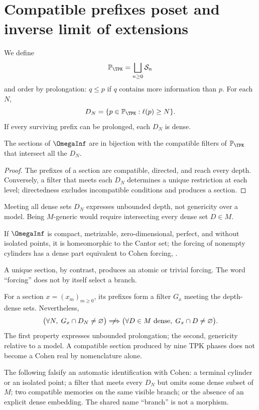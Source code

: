 \section{Compatible prefixes poset and inverse limit of extensions}

We define
\[
  \mathbb P_{\TPK}=\bigsqcup_{n\ge0}\mathcal S_n
\]
and order by prolongation: \(q\le p\) if \(q\) contains more information
than \(p\). For each \(N\),
\[
  D_N=\{p\in\mathbb P_{\TPK}:\ell(p)\ge N\}.
\]
If every surviving prefix can be prolonged, each \(D_N\) is dense.

\begin{theorem}
The sections of \(\OmegaInf\) are in bijection with the compatible filters
of \(\mathbb P_{\TPK}\) that intersect all the \(D_N\).
\end{theorem}

\begin{proof}
The prefixes of a section are compatible, directed, and reach every
depth. Conversely, a filter that meets each \(D_N\) determines a
unique restriction at each level; directedness excludes incompatible
conditions and produces a section.
\end{proof}

Meeting all dense sets \(D_N\) expresses unbounded depth, not
genericity over a model. Being \(M\)-generic would require intersecting every
dense set \(D\in M\).

\begin{proposition}
If \(\OmegaInf\) is compact, metrizable, zero-dimensional, perfect, and without
isolated points, it is homeomorphic to the Cantor set; the forcing of nonempty cylinders
has a dense part equivalent to Cohen forcing,
\citep{cohen1963,cohen1964}.
\end{proposition}

A unique section, by contrast, produces an atomic or trivial forcing.
The word “forcing” does not by itself select a branch.

For a section \(x=(x_m)_{m\ge0}\), its prefixes form a filter \(G_x\)
meeting the depth-dense sets. Nevertheless,
\[
  \bigl(\forall N,\;G_x\cap D_N\ne\varnothing\bigr)
  \centernot\Longrightarrow
  \bigl(\forall D\in M\text{ dense},\;G_x\cap D\ne\varnothing\bigr).
\]
The first property expresses unbounded prolongation; the second,
genericity relative to a model. A compatible section produced by
nine TPK phases does not become a Cohen real by nomenclature alone.

\begin{remark}
The following falsify an automatic identification with Cohen: a terminal cylinder or an
isolated point; a filter that meets every \(D_N\) but omits some
dense subset of \(M\); two compatible memories on the same visible branch; or the
absence of an explicit dense embedding. The shared name “branch” is not
a morphism.
\end{remark}

